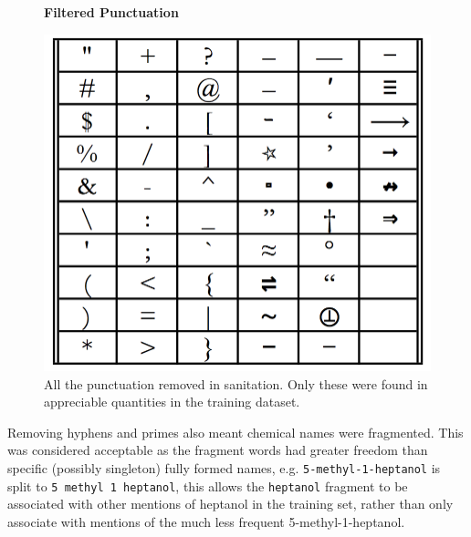\begin{figure}[H]
    \centering
    \textbf{Filtered Punctuation }\par\medskip
    \includegraphics[scale=0.2]{Algorithm/punct_table.png}
    \caption[Punctuation removed in sanitation processing]{All the punctuation removed in sanitation. Only these were found in appreciable quantities in the training dataset. }
     \label{fig:punct}
\end{figure}
Removing hyphens and primes also meant chemical names were fragmented. This was considered acceptable as the fragment words had greater freedom than specific (possibly singleton) fully formed names, e.g. \texttt{5-methyl-1-heptanol} is split to \texttt{5 methyl 1 heptanol}, this allows the \texttt{heptanol} fragment to be associated with other mentions of heptanol in the training set, rather than only associate with mentions of the much less frequent 5-methyl-1-heptanol. 

